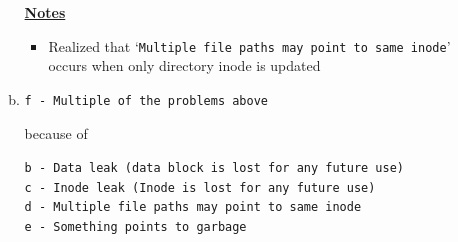 \documentclass[12pt]{article}
\begin{document}
\begin{enumerate}[1.]
\begin{enumerate}[a)]
        \bigskip

        \underline{\textbf{Notes}}

        \begin{itemize}
            \item Realized that `\texttt{Multiple file paths may point to same inode}' occurs when only directory inode is updated
        \end{itemize}

        \item

        \texttt{f - Multiple of the problems above}

        \bigskip

        because of

        \bigskip

        \texttt{b - Data leak (data block is lost for any future use)}\\
        \texttt{c - Inode leak (Inode is lost for any future use)}\\
        \texttt{d - Multiple file paths may point to same inode}\\
        \texttt{e - Something points to garbage}\\


    \end{enumerate}
\end{enumerate}
\end{document}
